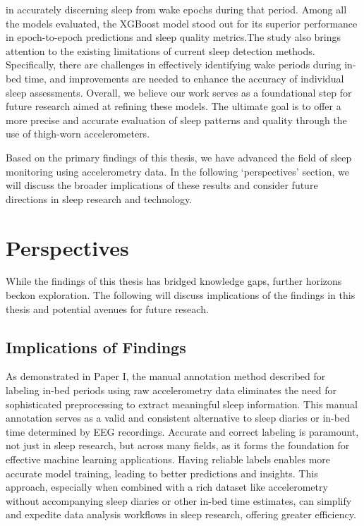 \documentclass[
  10pt,
]{scrbook}
\begin{document}
\begin{itemize}
  in accurately discerning sleep from wake epochs during that period.
  Among all the models evaluated, the XGBoost model stood out for its
  superior performance in epoch-to-epoch predictions and sleep quality
  metrics.The study also brings attention to the existing limitations of
  current sleep detection methods. Specifically, there are challenges in
  effectively identifying wake periods during in-bed time, and
  improvements are needed to enhance the accuracy of individual sleep
  assessments. Overall, we believe our work serves as a foundational
  step for future research aimed at refining these models. The ultimate
  goal is to offer a more precise and accurate evaluation of sleep
  patterns and quality through the use of thigh-worn accelerometers.
\end{itemize}

Based on the primary findings of this thesis, we have advanced the field
of sleep monitoring using accelerometry data. In the following
`perspectives' section, we will discuss the broader implications of
these results and consider future directions in sleep research and
technology.

\hypertarget{perspectives}{%
\chapter{Perspectives}\label{perspectives}}

While the findings of this thesis has bridged knowledge gaps, further
horizons beckon exploration. The following will discuss implications of
the findings in this thesis and potential avenues for future reseach.

\hypertarget{implications-of-findings}{%
\section{Implications of Findings}\label{implications-of-findings}}

As demonstrated in Paper I, the manual annotation method described for
labeling in-bed periods using raw accelerometry data eliminates the need
for sophisticated preprocessing to extract meaningful sleep information.
This manual annotation serves as a valid and consistent alternative to
sleep diaries or in-bed time determined by EEG recordings. Accurate and
correct labeling is paramount, not just in sleep research, but across
many fields, as it forms the foundation for effective machine learning
applications. Having reliable labels enables more accurate model
training, leading to better predictions and insights. This approach,
especially when combined with a rich dataset like accelerometry without
accompanying sleep diaries or other in-bed time estimates, can simplify
and expedite data analysis workflows in sleep research, offering greater
efficiency.
\end{document}
